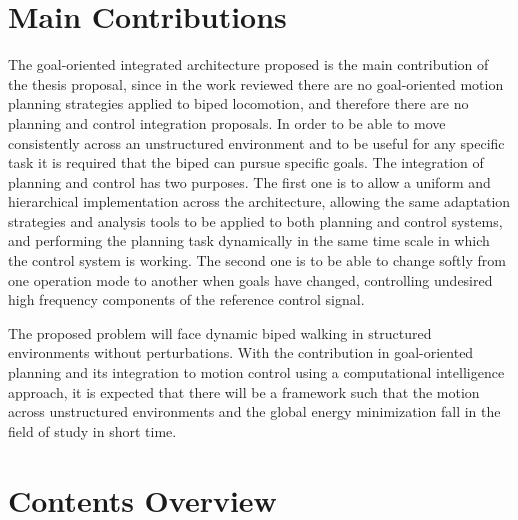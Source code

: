 \section{Main Contributions}
The goal-oriented integrated architecture proposed is the main
contribution of the thesis proposal, since in the work reviewed there
are no goal-oriented motion planning strategies applied to biped
locomotion, and therefore there are no planning and control
integration proposals. In order to be able to move consistently across
an unstructured environment and to be useful for any specific task it
is required that the biped can pursue specific goals. The integration
of planning and control has two purposes. The first one is to allow a
uniform and hierarchical implementation across the architecture,
allowing the same adaptation strategies and analysis tools to be
applied to both planning and control systems, and performing the
planning task dynamically in the same time scale in which the control
system is working. The second one is to be able to change softly from
one operation mode to another when goals have changed, controlling
undesired high frequency components of the reference control signal.


The proposed problem will face dynamic biped walking in structured
environments without perturbations. With the contribution in
goal-oriented planning and its integration to motion control using a
computational intelligence approach, it is expected that there will be
a framework such that the motion across unstructured environments and
the global energy minimization fall in the field of study in short
time.  


\section{Contents Overview}




